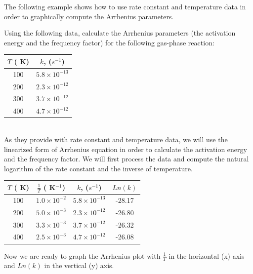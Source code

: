 \documentclass[main.tex]{subfiles}
\newcommand\chapterlabel{kinetics}
\begin{document}
\begin{description}



The following example shows how to use rate constant and temperature data in order to graphically compute the Arrhenius parameters.
\begin{example} %
Using the following data, calculate the Arrhenius parameters (the activation energy and the frequency factor) for the following gas-phase reaction:
\begin{center}\end{center}
\begin{center}\begin{tabular}[t]{   c  c   }
\toprule
  $T$ ( K)	&$k$, ($s^{-1}$) \\
\midrule
100&	$5.8\times 10^{-13}$\\
200&	$2.3\times 10^{-12}$\\
300&	$3.7\times 10^{-12}$\\
400&$4.7\times 10^{-12}$\\
\bottomrule
\end{tabular}\end{center}
\\
As they provide with rate constant and temperature data, we will use the linearized form of Arrhenius equation in order to calculate the activation energy and the frequency factor. We will first process the data and compute the natural logarithm of the rate constant and the inverse of temperature.
\begin{center}\begin{tabular}[t]{   c cc c   }
\toprule
  $T$ ( K)	&$\frac{1}{T}$ ( K$^{-1}$)	&$k$, ($s^{-1}$)&$Ln(k)$  \\
\midrule
100&		$1.0\times 10^{-2}$				&	$5.8\times 10^{-13}$&-28.17\\
200&		$5.0\times 10^{-3}$	&	$2.3\times 10^{-12}$&-26.80\\
300&		$3.3\times 10^{-3}$	&	$3.7\times 10^{-12}$&-26.32\\
400&		$2.5\times 10^{-3}$	&	$4.7\times 10^{-12}$&-26.08\\
\bottomrule
\end{tabular}\end{center}
Now we are ready to graph the Arrhenius plot with $\frac{1}{T}$ in the horizontal (x) axis and $Ln(k)$ in the vertical (y) axis.



\end{example}
\end{description}
\end{document}
